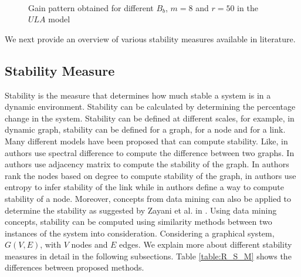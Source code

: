 \documentclass[preprint, twocolumn,5p]{elsarticle}
\begin{document}
    \begin{figure}[!htb]
        \centering
        \mbox
        {
            \hspace{-1.5cm}
            \hspace{-2.2cm}
        }
        \mbox
        {
            \hspace{-1.5cm}
            \hspace{-2.2cm}
        }
        \caption{Gain pattern obtained for different $B_{b}$, $m=8$ and $r=50$ in the $ULA$ model} \label{fig:gainpatern}
    \end{figure}

    We next provide an overview of various stability measures available in literature.

    \subsection{Stability Measure}\label{subsec:stability}

    Stability is the measure that determines how much stable a system is in a dynamic environment. Stability can be calculated by determining the percentage change in the system. Stability can be defined at different scales, for example, in dynamic graph, stability can be defined for a graph, for a node and for a link. Many different models have been proposed that can compute stability. Like, in \cite{Jurman2010} authors use spectral difference to compute the difference between two graphs. In \cite{Hanneke2010,Tang2010} authors use adjacency matrix to compute the stability of the graph. In \cite{Braha2006, Braha2009} authors rank the nodes based on degree to compute stability of the graph, in \cite{Zayani2012} authors use entropy to infer stability of the link while in \cite{Brust2007} authors define a way to compute stability of a node. Moreover, concepts from data mining can also be applied to determine the stability as suggested by Zayani et al. in \cite{Zayani2012}. Using data mining concepts, stability can be computed using similarity methods between two instances of the system into consideration. Considering a graphical system, $G(V,E)$, with $V$ nodes and $E$ edges. We explain more about different stability measures in detail in the following subsections. Table \ref{table:R_S_M} shows the differences between proposed methods.
\end{document}
